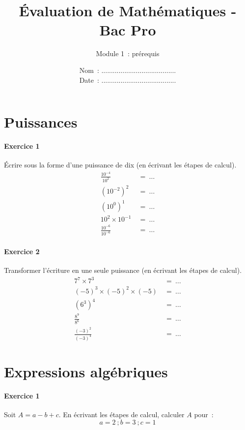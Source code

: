 \documentclass[a4paper]{article}
\begin{document}
  \title{Évaluation de Mathématiques - Bac Pro}
  \author{Module 1~: prérequis}
  \date{
    Nom~: .......................................\\
    \vspace{0.2cm}
    Date~: .......................................}
  \maketitle
  
  \section*{Puissances}
  \paragraph{Exercice 1}
  Écrire sous la forme d'une puissance de dix (en écrivant les étapes de calcul).
  \begin{align*}
    \frac{10^{-4}}{10^2} &\ = \ \dots\\
    (10^{-2})^2 &\ = \ \dots\\
    (10^0)^1 &\ = \ \dots\\
    10^2 \times 10^{-1} &\ = \ \dots\\
    \frac{10^{-6}}{10^{-6}} &\ = \ \dots
  \end{align*}

  \paragraph{Exercice 2}
  Transformer l'écriture en une seule puissance (en écrivant les étapes de calcul).
  \begin{align*}
    7^7 \times 7^3 &\ =\ \dots\\
    (-5)^3 \times (-5)^2 \times (-5) &\ =\ \dots\\
    (6^3)^4 &\ =\ \dots\\
    \frac{8^9}{8^6} &\ =\ \dots\\
    \frac{(-3)^2}{(-3)^4} &\ =\ \dots
  \end{align*}

  \section*{Expressions algébriques}
  \paragraph{Exercice 1}
  Soit $A = a - b + c$. En écrivant les étapes de calcul, calculer $A$ pour~:
  \[
    a = 2~; b = 3~; c = 1
  \]
  \vspace{2cm}
\end{document}
